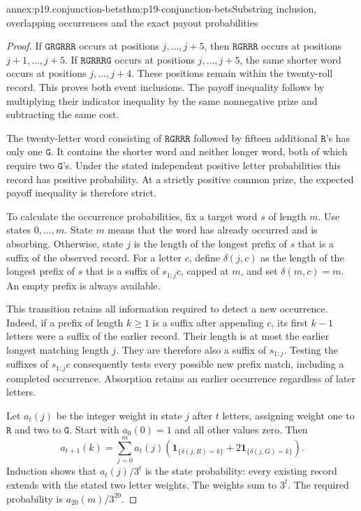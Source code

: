 \begin{annexitem}{annex:p19.conjunction-bets}{thm:p19-conjunction-bets}{Substring inclusion, overlapping occurrences and the exact payout probabilities}
\begin{proof}
If \(\texttt{GRGRRR}\) occurs at positions
\(j,\ldots,j+5\), then \(\texttt{RGRRR}\)
occurs at positions \(j+1,\ldots,j+5\).
If \(\texttt{RGRRRG}\) occurs at positions
\(j,\ldots,j+5\), the same shorter word occurs
at positions \(j,\ldots,j+4\).
These positions remain within the twenty-roll
record. This proves both event inclusions.
The payoff inequality follows by multiplying
their indicator inequality by the same
nonnegative prize and subtracting the same cost.

The twenty-letter word consisting of
\(\texttt{RGRRR}\) followed by fifteen additional
\(\texttt R\)'s has only one \(\texttt G\).
It contains the shorter word and neither longer
word, both of which require two \(\texttt G\)'s.
Under the stated independent positive letter
probabilities this record has positive probability.
At a strictly positive common prize, the expected
payoff inequality is therefore strict.

To calculate the occurrence probabilities, fix
a target word \(s\) of length \(m\). Use states
\(0,\ldots,m\). State \(m\) means that the word
has already occurred and is absorbing. Otherwise,
state \(j\) is the length of the longest prefix
of \(s\) that is a suffix of the observed record.
For a letter \(c\), define \(\delta(j,c)\) as
the length of the longest prefix of \(s\) that is a suffix
of \(s_{1:j}c\), capped at \(m\), and set
\(\delta(m,c)=m\).
An empty prefix is always available.

This transition retains all information required
to detect a new occurrence. Indeed, if a prefix
of length \(k\geq1\) is a suffix after appending
\(c\), its first \(k-1\) letters were a suffix
of the earlier record. Their length is at most
the earlier longest matching length \(j\).
They are therefore also a suffix of \(s_{1:j}\).
Testing the suffixes of \(s_{1:j}c\) consequently
tests every possible new prefix match, including
a completed occurrence. Absorption retains an
earlier occurrence regardless of later letters.

Let \(a_t(j)\) be the integer weight in state
\(j\) after \(t\) letters, assigning weight one
to \(\texttt R\) and two to \(\texttt G\).
Start with \(a_0(0)=1\) and all other values zero.
Then
\[
 a_{t+1}(k)=
 \sum_{j=0}^{m}a_t(j)
 \left(\mathbf1_{\{\delta(j,R)=k\}}
                  +2\mathbf1_{\{\delta(j,G)=k\}}\right).
\]
Induction shows that \(a_t(j)/3^t\) is the
state probability: every existing record
extends with the stated two letter weights.
The weights sum to \(3^t\).
The required probability is \(a_{20}(m)/3^{20}\).


\end{proof}
\end{annexitem}
